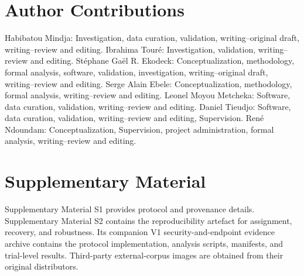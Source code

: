 \documentclass[preprint,12pt]{elsarticle}
\theoremstyle{plain}
\begin{document}
\section*{Author Contributions}
Habibatou Mindja: Investigation, data curation, validation, writing--original draft, writing--review and editing. Ibrahima Tour\'e: Investigation, validation, writing--review and editing. St\'ephane Ga\"el R. Ekodeck: Conceptualization, methodology, formal analysis, software, validation, investigation, writing--original draft, writing--review and editing. Serge Alain Ebele: Conceptualization, methodology, formal analysis, writing--review and editing. Leonel Moyou Metcheka: Software, data curation, validation, writing--review and editing. Daniel Tieudjo: Software, data curation, validation, writing--review and editing, Supervision. Ren\'e Ndoundam: Conceptualization, Supervision, project administration, formal analysis, writing--review and editing.
\section*{Supplementary Material}
Supplementary Material S1 provides protocol and provenance details. Supplementary Material S2 contains the reproducibility artefact for assignment, recovery, and robustness. Its companion V1 security-and-endpoint evidence archive contains the protocol implementation, analysis scripts, manifests, and trial-level results. Third-party external-corpus images are obtained from their original distributors.
\end{document}
